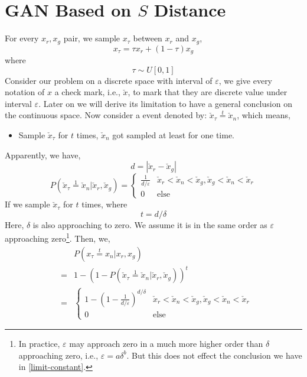 \documentclass[letterpaper]{article} %
\begin{document}
\section{GAN Based on $S$ Distance}
For every $x_{r}, x_{g}$ pair, we sample $x_{\tau}$ between $x_{r}$ and $x_g$,
\begin{equation}\label{x-epsilon}
  x_{\tau} = \tau x_{r} + (1-\tau) x_g
\end{equation}
where
\begin{equation}\label{epsilon}
  \tau \sim U[0,1]
\end{equation}
Consider our problem on a discrete space with interval of $\varepsilon$, we give every notation of $x$ a check mark, i.e., $\check{x}$, to mark that they are discrete value under interval $\varepsilon$.
Later on we will derive its limitation to have a general conclusion on the continuous space.
Now consider a event denoted by: $\check{x}_\tau\overset{t}{=}\check{x}_n$, which means,
\begin{itemize}
  \item Sample $\check{x}_\tau$ for $t$ times, $\check{x}_n$ got sampled at least for one time.
\end{itemize}
Apparently, we have,
\begin{equation}\label{d}
  d=|\check{x}_r-\check{x}_g|
\end{equation}
\begin{equation}\label{p-epsilon-pr-pg}
    P(\check{x}_\tau\overset{1}{=}\check{x}_n|\check{x}_r,\check{x}_g)=
    \begin{cases}
        \frac{1}{d/\varepsilon} &\mbox{$\check{x}_r<\check{x}_n<\check{x}_g,\check{x}_g<\check{x}_n<\check{x}_r$}\\
        0 &\mbox{else}
    \end{cases}
\end{equation}
If we sample $\check{x}_\tau$ for $t$ times, where
\begin{equation}\label{T}
  t = d/{\delta}
\end{equation}
Here, $\delta$ is also approaching to zero. We assume it is in the same order as $\varepsilon$ approaching zero\footnote{In practice, $\varepsilon$ may approach zero in a much more higher order than $\delta$ approaching zero, i.e., $\varepsilon=a\delta^b$. But this does not effect the conclusion we have in \eqref{limit-constant}.}.
Then, we,
\begin{eqnarray}\label{p-epsilon-pr-pg-T}
    && P(x_\tau\overset{t}{=}x_n|x_r,x_g) \nonumber\\
    \nonumber &=& 1 - (1-P(\check{x}_\tau\overset{1}{=}\check{x}_n|\check{x}_r,\check{x}_g))^t \\
    \nonumber &=&
    \begin{cases}
        1 - (1-\frac{1}{d/\varepsilon})^{d/\delta} &\mbox{$\check{x}_r<\check{x}_n<\check{x}_g,\check{x}_g<\check{x}_n<\check{x}_r$}\\
        0 &\mbox{else}
    \end{cases}
\end{eqnarray}
\end{document}
